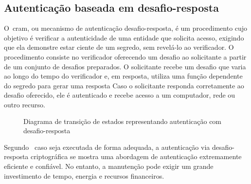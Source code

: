 \subsection{Autenticação baseada em desafio-resposta}
\label{subsec:autenticacao-desafio-resposta}

O~\acrfull{cram}, ou mecanismo de autenticação desafio-resposta, é um
procedimento
cujo objetivo é verificar a autenticidade de uma entidade que solicita acesso,
exigindo que ela demonstre estar ciente de um segredo, sem revelá-lo ao
verificador.
O procedimento consiste no verificador oferecendo um desafio ao solicitante a
partir de um conjunto de desafios preparados.
O solicitante recebe um desafio que varia ao longo do tempo do verificador e,
em resposta, utiliza uma função dependente do segredo para gerar uma resposta
Caso o solicitante responda corretamente ao desafio oferecido, ele é autenticado
e recebe acesso a um computador, rede ou outro recurso\cite{gilad2013}.

\begin{figure}[h!]
    \centering
    \caption[Diagrama representação autenticação via desafio-resposta]
    {Diagrama de transição de estados representando autenticação com
    desafio-resposta}
    \label{fig:diagrama-autenticacao-desafio-resposta}
\end{figure}

Segundo~\textcite{idrus2013} caso seja executada de forma adequada, a autenticação
via desafio-resposta criptográfica se mostra uma abordagem de autenticação extremamente
eficiente e confiável.
No entanto, a manutenção pode exigir um grande investimento de tempo, energia e
recursos financeiros.